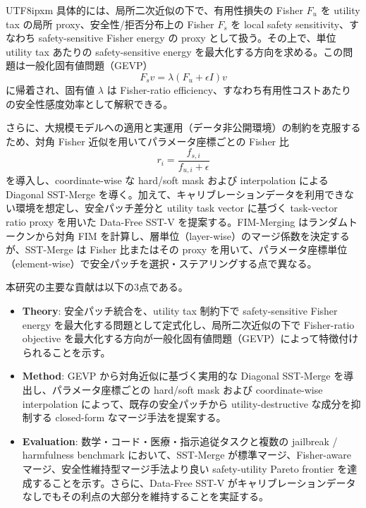 \documentclass[letterpaper]{article} %
\begin{document}
\begin{CJK*}{UTF8}{ipxm}
具体的には、局所二次近似の下で、有用性損失の Fisher $F_u$ を utility tax の局所 proxy、安全性/拒否分布上の Fisher $F_s$ を local safety sensitivity、すなわち safety-sensitive Fisher energy の proxy として扱う。その上で、単位 utility tax あたりの safety-sensitive energy を最大化する方向を求める。この問題は一般化固有値問題（GEVP）
\begin{equation}
F_s v = \lambda (F_u + \epsilon I)v
\end{equation}
に帰着され、固有値 $\lambda$ は Fisher-ratio efficiency、すなわち有用性コストあたりの安全性感度効率として解釈できる。

さらに、大規模モデルへの適用と実運用（データ非公開環境）の制約を克服するため、対角 Fisher 近似を用いてパラメータ座標ごとの Fisher 比
\begin{equation}
r_i = \frac{f_{s,i}}{f_{u,i}+\epsilon}
\end{equation}
を導入し、coordinate-wise な hard/soft mask および interpolation による Diagonal SST-Merge を導く。加えて、キャリブレーションデータを利用できない環境を想定し、安全パッチ差分と utility task vector に基づく task-vector ratio proxy を用いた Data-Free SST-V を提案する。FIM-Merging\citep{wang2026fim} はランダムトークンから対角 FIM を計算し、層単位（layer-wise）のマージ係数を決定するが、SST-Merge は Fisher 比またはその proxy を用いて、パラメータ座標単位（element-wise）で安全パッチを選択・ステアリングする点で異なる。

本研究の主要な貢献は以下の3点である。
\begin{itemize}
    \item \textbf{Theory}: 安全パッチ統合を、utility tax 制約下で safety-sensitive Fisher energy を最大化する問題として定式化し、局所二次近似の下で Fisher-ratio objective を最大化する方向が一般化固有値問題（GEVP）によって特徴付けられることを示す。
    \item \textbf{Method}: GEVP から対角近似に基づく実用的な Diagonal SST-Merge を導出し、パラメータ座標ごとの hard/soft mask および coordinate-wise interpolation によって、既存の安全パッチから utility-destructive な成分を抑制する closed-form なマージ手法を提案する。
    \item \textbf{Evaluation}: 数学・コード・医療・指示追従タスクと複数の jailbreak / harmfulness benchmark において、SST-Merge が標準マージ、Fisher-aware マージ、安全性維持型マージ手法より良い safety-utility Pareto frontier を達成することを示す。さらに、Data-Free SST-V がキャリブレーションデータなしでもその利点の大部分を維持することを実証する。
\end{itemize}


\end{CJK*}
\end{document}
